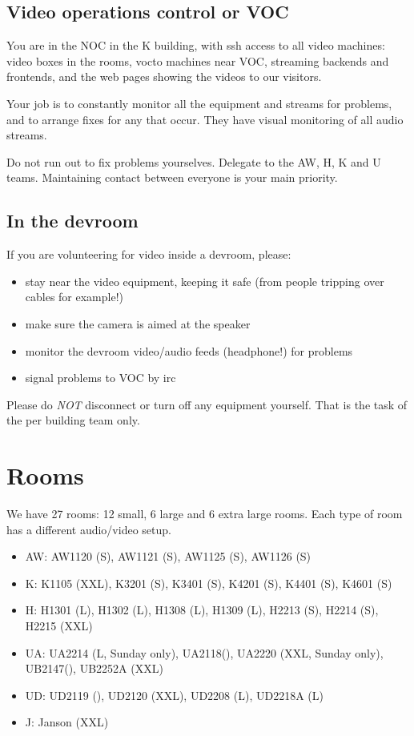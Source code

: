 \documentclass{article}
\begin{document}
\subsection{Video operations control or VOC}
You are in the NOC in the K building, with ssh access to all video machines: video boxes in the rooms, vocto machines near VOC, streaming backends and frontends, and the web pages showing the videos to our visitors.

Your job is to constantly monitor all the equipment and streams for problems, and to arrange fixes for any that occur. They have visual monitoring of all audio streams.

Do not run out to fix problems yourselves. Delegate to the AW, H, K and U teams. Maintaining contact between everyone is your main priority.

\subsection{In the devroom}
If you are volunteering for video inside a devroom, please:
\begin{itemize}
  \item stay near the video equipment, keeping it safe (from people tripping over cables for example!)
  \item make sure the camera is aimed at the speaker
  \item monitor the devroom video/audio feeds (headphone!) for problems
  \item signal problems to VOC by irc
\end{itemize}

Please do \emph{NOT} disconnect or turn off any equipment yourself. That is the task of the per building team only.

\section{Rooms}
We have 27 rooms: 12 small, 6 large and 6 extra large rooms. Each type of room has a different audio/video setup.
\begin{itemize}
  \item AW: AW1120 (S), AW1121 (S), AW1125 (S), AW1126 (S)
  \item K: K1105 (XXL), K3201 (S), K3401 (S), K4201 (S), K4401 (S), K4601 (S)
  \item H: H1301 (L), H1302 (L), H1308 (L), H1309 (L), H2213 (S), H2214 (S), H2215 (XXL)
  \item UA: UA2214 (L, Sunday only), UA2118(), UA2220 (XXL, Sunday only), UB2147(), UB2252A (XXL)
  \item UD: UD2119 (), UD2120 (XXL), UD2208 (L), UD2218A (L)
  \item J: Janson (XXL)
\end{itemize}
\end{document}
